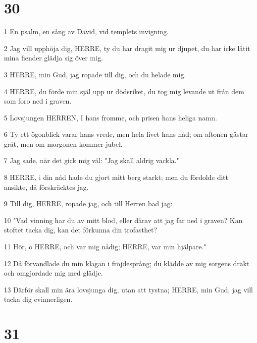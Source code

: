 \chapter{30}

\par 1 En psalm, en sång av David, vid templets invigning.
\par 2 Jag vill upphöja dig, HERRE, ty du har dragit mig ur djupet, du har icke låtit mina fiender glädja sig över mig.
\par 3 HERRE, min Gud, jag ropade till dig, och du helade mig.
\par 4 HERRE, du förde min själ upp ur dödsriket, du tog mig levande ut från dem som foro ned i graven.
\par 5 Lovsjungen HERREN, I hans fromme, och prisen hans heliga namn.
\par 6 Ty ett ögonblick varar hans vrede, men hela livet hans nåd; om aftonen gästar gråt, men om morgonen kommer jubel.
\par 7 Jag sade, när det gick mig väl: "Jag skall aldrig vackla."
\par 8 HERRE, i din nåd hade du gjort mitt berg starkt; men du fördolde ditt ansikte, då förskräcktes jag.
\par 9 Till dig, HERRE, ropade jag, och till Herren bad jag:
\par 10 "Vad vinning har du av mitt blod, eller därav att jag far ned i graven? Kan stoftet tacka dig, kan det förkunna din trofasthet?
\par 11 Hör, o HERRE, och var mig nådig; HERRE, var min hjälpare."
\par 12 Då förvandlade du min klagan i fröjdesprång; du klädde av mig sorgens dräkt och omgjordade mig med glädje.
\par 13 Därför skall min ära lovsjunga dig, utan att tystna; HERRE, min Gud, jag vill tacka dig evinnerligen.

\chapter{31}

